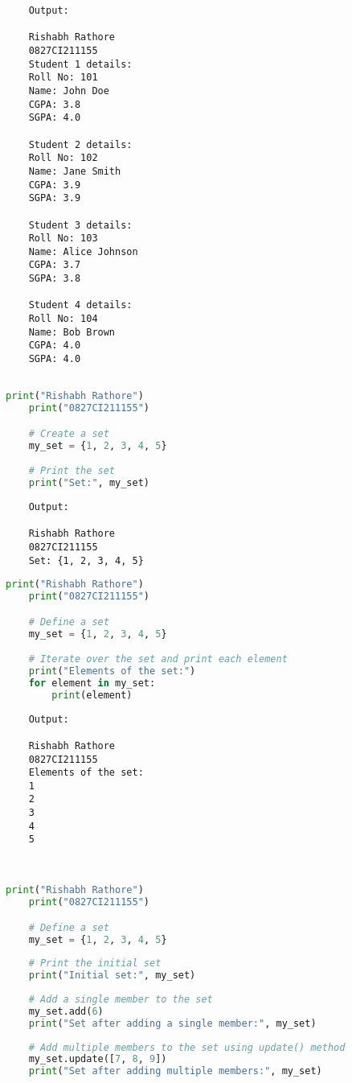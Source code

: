 \documentclass{report}
\begin{document}
\begin{verbatim}
	Output:

	Rishabh Rathore
	0827CI211155
	Student 1 details:
	Roll No: 101
	Name: John Doe
	CGPA: 3.8
	SGPA: 4.0

	Student 2 details:
	Roll No: 102
	Name: Jane Smith
	CGPA: 3.9
	SGPA: 3.9

	Student 3 details:
	Roll No: 103
	Name: Alice Johnson
	CGPA: 3.7
	SGPA: 3.8

	Student 4 details:
	Roll No: 104
	Name: Bob Brown
	CGPA: 4.0
	SGPA: 4.0


\end{verbatim}



\newpage

\sol 
\begin{lstlisting}[language=Python]
	print("Rishabh Rathore")
	print("0827CI211155")

	# Create a set
	my_set = {1, 2, 3, 4, 5}

	# Print the set
	print("Set:", my_set)
\end{lstlisting}

\begin{verbatim}
	Output:

	Rishabh Rathore
	0827CI211155
	Set: {1, 2, 3, 4, 5}

\end{verbatim}


\newpage


\sol 
\begin{lstlisting}[language=Python]
	print("Rishabh Rathore")
	print("0827CI211155")

	# Define a set
	my_set = {1, 2, 3, 4, 5}

	# Iterate over the set and print each element
	print("Elements of the set:")
	for element in my_set:
		print(element)
\end{lstlisting}

\begin{verbatim}
	Output:

	Rishabh Rathore
	0827CI211155
	Elements of the set:
	1
	2
	3
	4
	5
	
	
\end{verbatim}


\newpage


\sol 
\begin{lstlisting}[language=Python]
	print("Rishabh Rathore")
	print("0827CI211155")

	# Define a set
	my_set = {1, 2, 3, 4, 5}
	
	# Print the initial set
	print("Initial set:", my_set)
	
	# Add a single member to the set
	my_set.add(6)
	print("Set after adding a single member:", my_set)
	
	# Add multiple members to the set using update() method
	my_set.update([7, 8, 9])
	print("Set after adding multiple members:", my_set)
\end{lstlisting}
\end{document}
